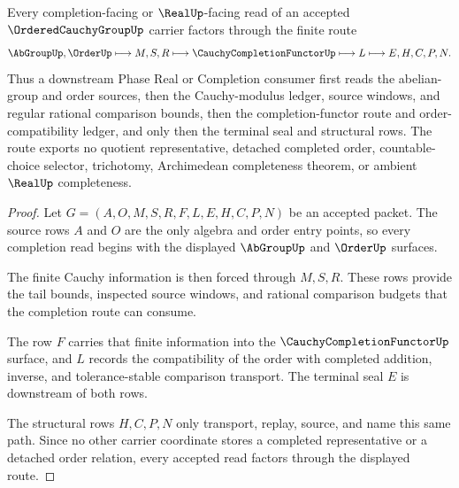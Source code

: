 \begin{theorem}
\label{thm:ordered-cauchy-group-order-compatible-completion}
Every completion-facing or $\RealUp$-facing read of an accepted $\OrderedCauchyGroupUp$ carrier factors through the finite route
$$
\AbGroupUp,\OrderUp \longmapsto M,S,R \longmapsto \CauchyCompletionFunctorUp \longmapsto L \longmapsto E,H,C,P,N .
$$
Thus a downstream Phase Real or Completion consumer first reads the abelian-group and order sources, then the Cauchy-modulus ledger, source windows, and regular rational comparison bounds, then the completion-functor route and order-compatibility ledger, and only then the terminal seal and structural rows. The route exports no quotient representative, detached completed order, countable-choice selector, trichotomy, Archimedean completeness theorem, or ambient $\RealUp$ completeness.
\end{theorem}
\begin{proof}
Let $G=(A,O,M,S,R,F,L,E,H,C,P,N)$ be an accepted packet. The source rows $A$ and $O$ are the only algebra and order entry points, so every completion read begins with the displayed $\AbGroupUp$ and $\OrderUp$ surfaces.

The finite Cauchy information is then forced through $M,S,R$. These rows provide the tail bounds, inspected source windows, and rational comparison budgets that the completion route can consume.

The row $F$ carries that finite information into the $\CauchyCompletionFunctorUp$ surface, and $L$ records the compatibility of the order with completed addition, inverse, and tolerance-stable comparison transport. The terminal seal $E$ is downstream of both rows.

The structural rows $H,C,P,N$ only transport, replay, source, and name this same path. Since no other carrier coordinate stores a completed representative or a detached order relation, every accepted read factors through the displayed route.
\end{proof}



